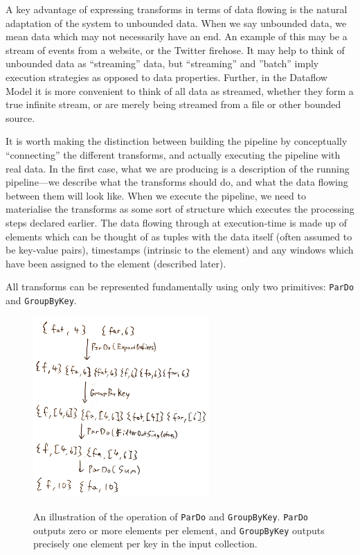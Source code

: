 A key advantage of expressing transforms in terms of data flowing is the natural adaptation of the system to unbounded data.
When we say unbounded data, we mean data which may not necessarily have an end.
An example of this may be a stream of events from a website, or the Twitter firehose.
It may help to think of unbounded data as ``streaming'' data, but ``streaming'' and ''batch'' imply execution strategies as opposed to data properties.
Further, in the Dataflow Model it is more convenient to think of all data as streamed, whether they form a true infinite stream, or are merely being streamed from a file or other bounded source.

It is worth making the distinction between building the pipeline by conceptually ``connecting'' the different transforms, and actually executing the pipeline with real data.
In the first case, what we are producing is a description of the running pipeline---we describe what the transforms should do, and what the data flowing between them will look like.
When we execute the pipeline, we need to materialise the transforms as some sort of structure which executes the processing steps declared earlier.
The data flowing through at execution-time is made up of elements which can be thought of as tuples with the data itself (often assumed to be key-value pairs), timestamps (intrinsic to the element) and any windows which have been assigned to the element (described later).

All transforms can be represented fundamentally using only two primitives: \verb|ParDo| and \verb|GroupByKey|\footnotemark[2].


\begin{figure}[h]
	\centering
	\includegraphics[width=0.6\textwidth]{images/temp/pardo-gbk}
	\label{fig:prep:pardo-gbk}
	\caption{An illustration of the operation of \texttt{ParDo} and \texttt{GroupByKey}. \texttt{ParDo} outputs zero or more elements per element, and \texttt{GroupByKey} outputs precisely one element per key in the input collection.}
\end{figure}


